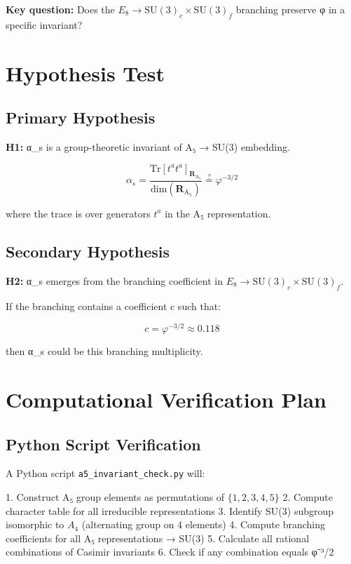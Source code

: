 \documentclass{article}
\begin{document}
\textbf{Key question:} Does the $E_8 \to \text{SU}(3)_c \times \text{SU}(3)_f$ branching preserve φ in a specific invariant?

\section{Hypothesis Test}

\subsection{Primary Hypothesis}

\textbf{H1:} α_s is a group-theoretic invariant of A₅ → SU(3) embedding.

\[
\alpha_s = \frac{\text{Tr}[t^a t^a]_{\mathbf{R}_\text{A}_5}}{\text{dim}(\mathbf{R}_\text{A}_5)} \stackrel{?}{=} \varphi^{-3/2}
\]

where the trace is over generators $t^a$ in the A₅ representation.

\subsection{Secondary Hypothesis}

\textbf{H2:} α_s emerges from the branching coefficient in $E_8 \to \text{SU}(3)_c \times \text{SU}(3)_f$.

If the branching contains a coefficient c such that:

\[
c = \varphi^{-3/2} \approx 0.118
\]

then α_s could be this branching multiplicity.

\section{Computational Verification Plan}

\subsection{Python Script Verification}

A Python script \texttt{a5\_invariant\_check.py} will:

1. Construct A₅ group elements as permutations of $\{1, 2, 3, 4, 5\}$
2. Compute character table for all irreducible representations
3. Identify SU(3) subgroup isomorphic to $A_4$ (alternating group on 4 elements)
4. Compute branching coefficients for all A₅ representations → SU(3)
5. Calculate all rational combinations of Casimir invariants
6. Check if any combination equals φ⁻³/2
\end{document}
